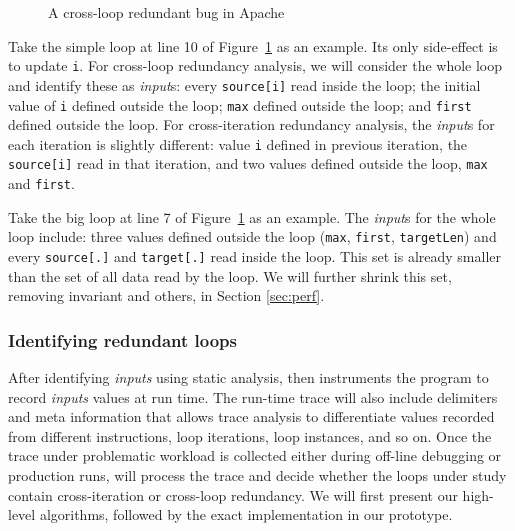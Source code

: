 \begin{figure}
  \centering
  \mbox{}
  \caption{A cross-loop redundant bug in Apache}
  \label{fig:Apache34464}
\end{figure}

Take the simple loop at line 10 of Figure~\ref{fig:Apache34464} as an example.
Its only side-effect is to update \texttt{i}.
For cross-loop redundancy analysis, we will consider the whole loop and 
identify these as \textit{input}s:
every \texttt{source[i]} read inside the loop;
the initial value of \texttt{i} defined outside the loop;
\texttt{max} defined outside the loop; 
and \texttt{first} defined outside the loop.
For cross-iteration redundancy analysis, the \textit{input}s for each
iteration is slightly different:
value \texttt{i} defined in previous iteration, 
the \texttt{source[i]} read in that iteration, 
and two values defined outside the loop, \texttt{max} and \texttt{first}.  

Take the big loop at line 7 of Figure~\ref{fig:Apache34464} as an example.
The \textit{input}s for the whole loop include:
three values defined outside the loop
(\texttt{max}, \texttt{first}, \texttt{targetLen}) and every
\texttt{source[.]} and \texttt{target[.]} read inside the loop.
This set is already smaller than the set of all data read by the loop.
We will further shrink this set, removing invariant and others, 
in Section \ref{sec:perf}.



\subsubsection{Identifying redundant loops}
\label{sec:cal}

After identifying \textit{inputs} using static analysis, 
\Tool then instruments the program to record \textit{inputs} values at run time.
The run-time trace will also include delimiters and meta information that allows
trace analysis to differentiate values recorded from different instructions, 
loop
iterations, loop instances, and so on.
Once the trace under problematic workload is collected either during
off-line debugging or production runs, 
\Tool will process the trace and decide
whether the loops under study contain cross-iteration or 
cross-loop redundancy. We will first present our high-level algorithms, followed
by the exact implementation in our prototype.


